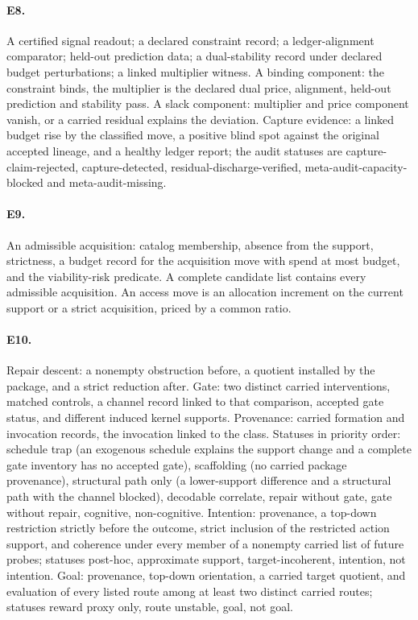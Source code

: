 \paragraph{E8.} A certified signal readout; a declared constraint record; a ledger-alignment
comparator; held-out prediction data; a dual-stability record under declared budget perturbations;
a linked multiplier witness. A binding component: the constraint binds, the multiplier is the declared
dual price, alignment, held-out prediction and stability pass. A slack component: multiplier and
price component vanish, or a carried residual explains the deviation. Capture evidence: a linked budget
rise by the classified move, a positive blind spot against the original accepted lineage, and a healthy
ledger report; the audit statuses are capture-claim-rejected, capture-detected,
residual-discharge-verified, meta-audit-capacity-blocked and meta-audit-missing.

\paragraph{E9.} An admissible acquisition: catalog membership, absence from the support, strictness,
a budget record for the acquisition move with spend at most budget, and the viability-risk predicate.
A complete candidate list contains every admissible acquisition. An access move is an allocation
increment on the current support or a strict acquisition, priced by a common ratio.

\paragraph{E10.} Repair descent: a nonempty obstruction before, a quotient installed by the package,
and a strict reduction after. Gate: two distinct carried interventions, matched controls, a channel
record linked to that comparison, accepted gate status, and different induced kernel supports.
Provenance: carried formation and invocation records, the invocation linked to the class.
Statuses in priority order: schedule trap (an exogenous schedule explains the support change and a
complete gate inventory has no accepted gate), scaffolding (no carried package provenance),
structural path only (a lower-support difference and a structural path with the channel blocked),
decodable correlate, repair without gate, gate without repair, cognitive, non-cognitive. Intention:
provenance, a top-down restriction strictly before the outcome, strict inclusion of the restricted
action support, and coherence under every member of a nonempty carried list of future probes;
statuses post-hoc, approximate support, target-incoherent, intention, not intention. Goal: provenance,
top-down orientation, a carried target quotient, and evaluation of every listed route among at least
two distinct carried routes; statuses reward proxy only, route unstable, goal, not goal.

